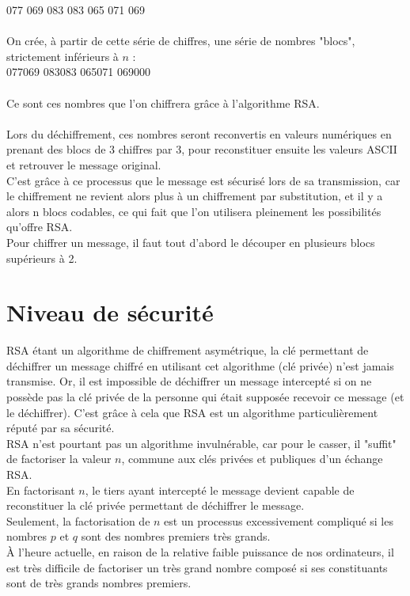 		077 069 083 083 065 071 069\\
		\\
		On crée, à partir de cette série de chiffres, une série de nombres "blocs", strictement inférieurs à $n$ :\\
		077069 083083 065071 069000\\
		\\
		Ce sont ces nombres que l'on chiffrera grâce à l'algorithme RSA.\\
		\\
		Lors du déchiffrement, ces nombres seront reconvertis en valeurs numériques en prenant des blocs de 3 chiffres par 3, pour reconstituer ensuite les valeurs ASCII et retrouver le message original.\\
		C'est grâce à ce processus que le message est sécurisé lors de sa transmission, car le chiffrement ne revient alors plus à un chiffrement par substitution, et il y a alors n blocs codables, ce qui fait que l'on utilisera pleinement les possibilités qu'offre RSA.\\
		Pour chiffrer un message, il faut tout d'abord le découper en plusieurs blocs supérieurs à 2.
	\section{Niveau de sécurité}
		RSA étant un algorithme de chiffrement asymétrique, la clé permettant de déchiffrer un message chiffré en utilisant cet algorithme (clé privée) n'est jamais transmise. Or, il est impossible de déchiffrer un message intercepté si on ne possède pas la clé privée de la personne qui était supposée recevoir ce message (et le déchiffrer). C'est grâce à cela que RSA est un algorithme particulièrement réputé par sa sécurité.\\
		RSA n'est pourtant pas un algorithme invulnérable, car pour le casser, il "suffit" de factoriser la valeur $n$, commune aux clés privées et publiques d'un échange RSA.\\
		En factorisant $n$, le tiers ayant intercepté le message devient capable de reconstituer la clé privée permettant de déchiffrer le message.\\
		Seulement, la factorisation de $n$ est un processus excessivement compliqué si les nombres $p$ et $q$ sont des nombres premiers très grands.\\
		À l'heure actuelle, en raison de la relative faible puissance de nos ordinateurs, il est très difficile de factoriser un très grand nombre composé si ses constituants sont de très grands nombres premiers.
